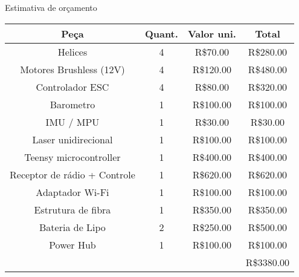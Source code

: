 \begin{frame}[t]{Estimativa de orçamento}
    \transboxout[duration=0.5]
    \centering

    \begin{tabular}{ c|c|c|c }
                  Peça             & Quant. & Valor uni. & Total     \\ \hline
                Helices            & 4      & R\$70.00   & R\$280.00 \\
        Motores Brushless (12V)    & 4      & R\$120.00  & R\$480.00 \\
            Controlador ESC        & 4      & R\$80.00   & R\$320.00 \\
               Barometro           & 1      & R\$100.00  & R\$100.00 \\
               IMU / MPU           & 1      & R\$30.00   & R\$30.00  \\
          Laser unidirecional      & 1      & R\$100.00  & R\$100.00 \\
         Teensy microcontroller    & 1      & R\$400.00  & R\$400.00 \\
      Receptor de rádio + Controle & 1      & R\$620.00  & R\$620.00 \\
            Adaptador Wi-Fi        & 1      & R\$100.00  & R\$100.00 \\
           Estrutura de fibra      & 1      & R\$350.00  & R\$350.00 \\
            Bateria de Lipo        & 2      & R\$250.00  & R\$500.00 \\
               Power Hub           & 1      & R\$100.00  & R\$100.00 \\ \hline
               & & & R\$3380.00    \end{tabular}

\end{frame}
